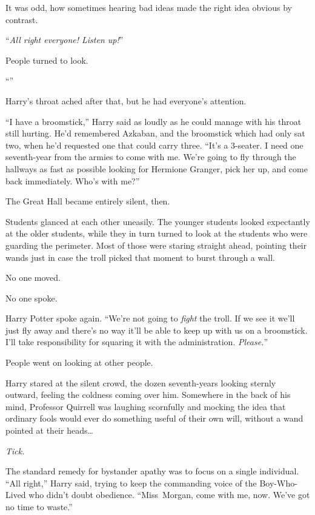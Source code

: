 It was odd, how sometimes hearing bad ideas made the right idea obvious by contrast.

“\emph{All right everyone! Listen up!}”

People turned to look.

“”

Harry’s throat ached after that, but he had everyone’s attention.

“I have a broomstick,” Harry said as loudly as he could manage with his throat still hurting. He’d remembered Azkaban, and the broomstick which had only sat two, when he’d requested one that could carry three. “It’s a 3-seater. I need one seventh-year from the armies to come with me. We’re going to fly through the hallways as fast as possible looking for Hermione Granger, pick her up, and come back immediately. Who’s with me?”

The Great Hall became entirely silent, then.

\later

Students glanced at each other uneasily. The younger students looked expectantly at the older students, while they in turn turned to look at the students who were guarding the perimeter. Most of those were staring straight ahead, pointing their wands just in case the troll picked that moment to burst through a wall.

No one moved.

No one spoke.

Harry Potter spoke again. “We’re not going to \emph{fight} the troll. If we see it we’ll just fly away and there’s no way it’ll be able to keep up with us on a broomstick. I’ll take responsibility for squaring it with the administration. \emph{Please.}”

People went on looking at other people.

\later

Harry stared at the silent crowd, the dozen seventh-years looking sternly outward, feeling the coldness coming over him. Somewhere in the back of his mind, Professor Quirrell was laughing scornfully and mocking the idea that ordinary fools would ever do something useful of their own will, without a wand pointed at their heads…

\emph{Tick.}

The standard remedy for bystander apathy was to focus on a single individual. “All right,” Harry said, trying to keep the commanding voice of the Boy-Who-Lived who didn’t doubt obedience. “Miss~Morgan, come with me, now. We’ve got no time to waste.”

